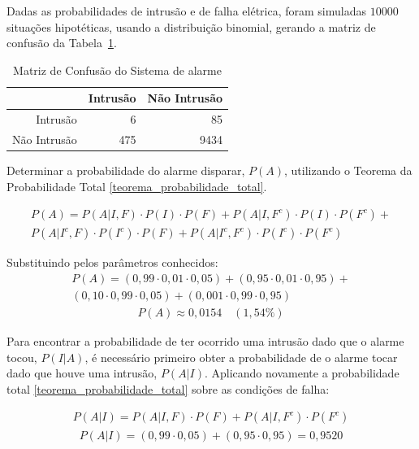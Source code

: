 Dadas as probabilidades de intrusão e de falha elétrica, foram simuladas $10000$ situações hipotéticas, usando a distribuição binomial, gerando a matriz de confusão da Tabela~\ref{tab:matriz_confusao_sistema_de_alarme}. 


\begin{table}[ht]
	\centering
	\begin{tabular}{rrr}
		\hline
		& Intrusão & Não Intrusão \\ 
		\hline
		Intrusão &   6 &  85 \\ 
		Não Intrusão & 475 & 9434 \\ 
		\hline
	\end{tabular}
	\caption{Matriz de Confusão do Sistema de alarme} 
	\label{tab:matriz_confusao_sistema_de_alarme}
\end{table}



Determinar a probabilidade do alarme disparar, $P(A)$, utilizando o Teorema da Probabilidade Total \ref{teorema_probabilidade_total}.

\begin{align*}
	P(A) = P(A|I,F) \cdot P(I) \cdot P(F) + P(A|I,F^c) \cdot P(I) \cdot P(F^c) + \\
	 P(A|I^c,F) \cdot P(I^c) \cdot P(F) + P(A|I^c,F^c) \cdot P(I^c) \cdot P(F^c)
\end{align*}


Substituindo pelos parâmetros conhecidos:
\begin{align*}
	P(A) = (0{,}99 \cdot 0{,}01 \cdot 0{,}05) + (0{,}95 \cdot 0{,}01 \cdot 0{,}95)+ \\
	 (0{,}10 \cdot 0{,}99 \cdot 0{,}05) + (0{,}001 \cdot 0{,}99 \cdot 0{,}95)
\end{align*}
\begin{align*}
	P(A) \approx 0{,}0154 \quad (1{,}54\%)
\end{align*}


Para encontrar a probabilidade de ter ocorrido uma intrusão dado que o alarme tocou, $P(I|A)$, é necessário primeiro obter a probabilidade de o alarme tocar dado que houve uma intrusão, $P(A|I)$. Aplicando novamente a probabilidade total \ref{teorema_probabilidade_total} sobre as condições de falha:

\begin{align*}
	P(A|I) = P(A|I,F) \cdot P(F) + P(A|I,F^c) \cdot P(F^c)
\end{align*}
\begin{align*}
	P(A|I) = (0{,}99 \cdot 0{,}05) + (0{,}95 \cdot 0{,}95) = 0{,}9520
\end{align*}

